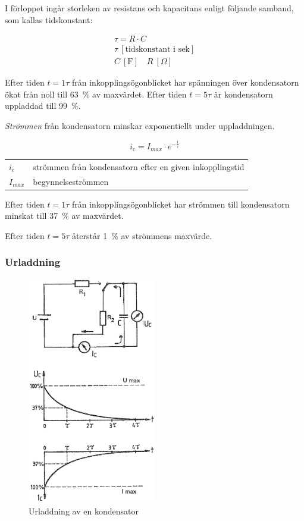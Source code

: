 I förloppet ingår storleken av resistans och kapacitans enligt följande samband,
som kallas tidskonstant:

\begin{gather*}
  \tau = R \cdot C \\
  \tau\ [\text{tidskonstant i sek}] \\  
  C\ [\text{F}] \quad R\ [Ω]
\end{gather*}

Efter tiden \(t = 1\tau\) från inkopplingsögonblicket har spänningen över
kondensatorn ökat från noll till 63~\% av maxvärdet. Efter tiden \(t = 5\tau\)
är kondensatorn uppladdad till 99~\%.

\emph{Strömmen} från kondensatorn minskar exponentiellt under uppladdningen.

\[i_c = I_{max} \cdot e^{-\frac{t}{\tau}}\]

\begin{tabular}{lp{}}
  \(i_c\) & strömmen från kondensatorn efter en given inkopplingstid \\
  \(I_{max}\) & begynnelseströmmen \\
\end{tabular}

Efter tiden \(t = 1\tau\) från inkopplingsögonblicket har strömmen till
kondensatorn minskat till 37~\% av maxvärdet.

Efter tiden \(t = 5\tau\) återstår 1~\% av strömmens maxvärde.

\subsubsection{Urladdning}

\begin{figure}
\includegraphics[width=0.5\textwidth]{images/bild_2_3-09.png}
\caption{Urladdning av en kondensator}
\label{fig:BildII3-09}
\end{figure}

